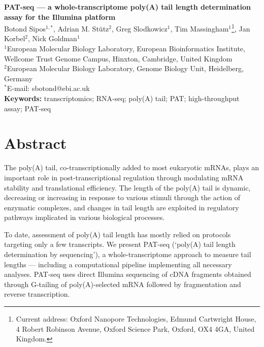 \documentclass[10pt]{article}
\date{}
\begin{document}
\begin{flushleft}
{\Large
\textbf{PAT-seq --- a whole-transcriptome poly(A) tail length determination assay for the Illumina platform}
}
\\
\vspace{5mm}
Botond Sipos$^{1, \ast}$, 
Adrian M. St\"utz$^{2}$, 
Greg Slodkowicz$^{1}$,
Tim Massingham$^{1}$\footnote{Current address: Oxford Nanopore Technologies, Edmund Cartwright House, 4 Robert Robinson Avenue, Oxford Science Park, Oxford, OX4 4GA, United Kingdom.},
Jan Korbel$^{2}$, 
Nick Goldman$^{1}$
\\
\vspace{5mm}
$^1$European Molecular Biology Laboratory, European Bioinformatics Institute, Wellcome Trust Genome Campus, Hinxton, Cambridge, United Kingdom
\\
$^2$European Molecular Biology Laboratory, Genome Biology Unit, Heidelberg, Germany 
\\
$^\ast$E-mail: sbotond@ebi.ac.uk
\\
\vspace{5mm}
\textbf{Keywords:} transcriptomics; RNA-seq; poly(A) tail; PAT; high-throughput assay; PAT-seq

\end{flushleft}

\section*{Abstract}

The poly(A) tail, co-transcriptionally added to most eukaryotic mRNAs, plays an important role in post-transcriptional regulation through modulating mRNA stability and translational efficiency. The length of the poly(A) tail is dynamic, decreasing or increasing in response to various stimuli through the action of enzymatic complexes, and changes in tail length are exploited in regulatory pathways implicated in various biological processes.

To date, assessment of poly(A) tail length has mostly relied on protocols targeting only a few transcripts. We present PAT-seq (`poly(A) tail length determination by sequencing'), a whole-transcriptome approach to measure tail lengths  --- including a computational pipeline implementing all necessary analyses. PAT-seq uses direct Illumina sequencing of cDNA fragments obtained through G-tailing of poly(A)-selected mRNA followed by fragmentation and reverse transcription. 
\end{document}
